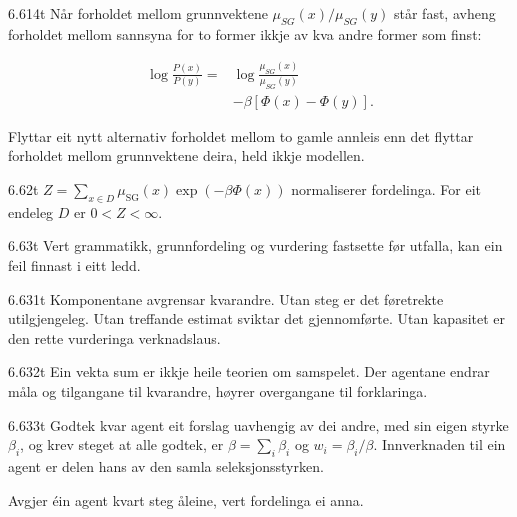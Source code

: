 \begin{formproposition}{6.614}{t}
Når forholdet mellom grunnvektene \(\mu_{SG}(x)/\mu_{SG}(y)\) står fast, avheng forholdet mellom sannsyna for to former ikkje av kva andre former som finst:

\[
\begin{aligned}
\log\frac{P(x)}{P(y)}={}&\log\frac{\mu_{SG}(x)}{\mu_{SG}(y)}\\
&-\beta[\Phi(x)-\Phi(y)].
\end{aligned}
\]

Flyttar eit nytt alternativ forholdet mellom to gamle annleis enn det flyttar forholdet mellom grunnvektene deira, held ikkje modellen.
\end{formproposition}

\begin{formproposition}{6.62}{t}
\(Z=\sum_{x\in D}\mu_{\mathrm{SG}}(x)\exp(-\beta\Phi(x))\) normaliserer fordelinga. For eit endeleg \(D\) er \(0<Z<\infty\).
\end{formproposition}

\begin{formproposition}{6.63}{t}
Vert grammatikk, grunnfordeling og vurdering fastsette før utfalla, kan ein feil finnast i eitt ledd.
\end{formproposition}

\begin{formproposition}{6.631}{t}
Komponentane avgrensar kvarandre. Utan steg er det føretrekte utilgjengeleg. Utan treffande estimat sviktar det gjennomførte. Utan kapasitet er den rette vurderinga verknadslaus.
\end{formproposition}

\begin{formproposition}{6.632}{t}
Ein vekta sum er ikkje heile teorien om samspelet. Der agentane endrar måla og tilgangane til kvarandre, høyrer overgangane til forklaringa.
\end{formproposition}

\begin{formproposition}{6.633}{t}
Godtek kvar agent eit forslag uavhengig av dei andre, med sin eigen styrke \(\beta_i\), og krev steget at alle godtek, er \(\beta=\sum_i\beta_i\) og \(w_i=\beta_i/\beta\). Innverknaden til ein agent er delen hans av den samla seleksjonsstyrken.

Avgjer éin agent kvart steg åleine, vert fordelinga ei anna.
\end{formproposition}

